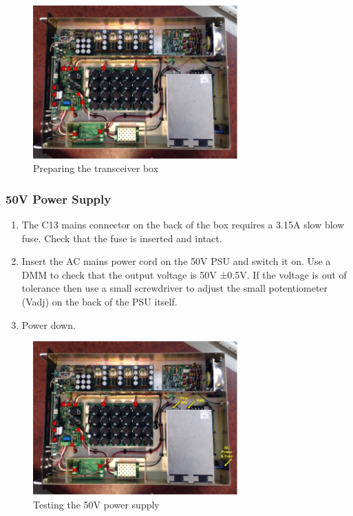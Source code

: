 \begin{figure}[H]
	\centering
	\includegraphics[width=0.7\textwidth]{images/hardware/box_prep.jpg}
	\caption{Preparing the transceiver box}
	\label{fig:hw_box_prep}
\end{figure}

\subsubsection{50V Power Supply}

\begin{enumerate}
	\item The C13 mains connector on the back of the box requires a 3.15A slow blow fuse. Check that the fuse is inserted and intact.
	\item Insert the AC mains power cord on the 50V PSU and switch it on. Use a DMM to check that the output voltage is 50V ±0.5V. If the voltage is out of tolerance then use a small screwdriver to adjust the small potentiometer (Vadj) on the back of the PSU itself.
	\item Power down.
\end{enumerate}

\begin{figure}[H]
	\centering
	\includegraphics[width=0.7\textwidth]{images/hardware/box_50v.jpg}
	\caption{Testing the 50V power supply}
	\label{fig:hw_box_50v}
\end{figure}

